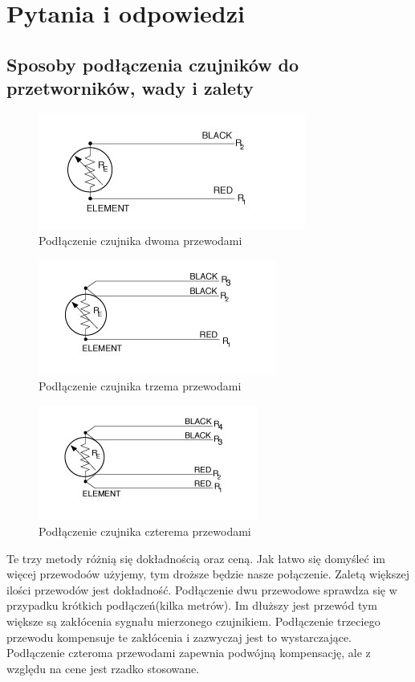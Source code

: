 \documentclass{article}
\begin{document}
\section{Pytania i odpowiedzi}
\subsection{Sposoby podłączenia czujników do przetworników, wady i zalety}
\begin{figure}[h!]
    \centering
    \includegraphics{cw23.jpg}
    \caption{Podłączenie czujnika dwoma przewodami}
    \label{fig:my_label}
\end{figure}
\begin{figure}[h!]
    \centering
    \includegraphics{cw24.jpg}
    \caption{Podłączenie czujnika trzema przewodami}
    \label{fig:my_label}
\end{figure}
\begin{figure}[h!]
    \centering
    \includegraphics{cw25.jpg}
    \caption{Podłączenie czujnika czterema przewodami}
    \label{fig:my_label}
\end{figure}
Te trzy metody różnią się dokładnością oraz ceną. Jak łatwo się domyśleć im więcej przewodoów użyjemy, tym droższe będzie nasze połączenie.
Zaletą większej ilości przewodów jest dokładność. Podłączenie dwu przewodowe sprawdza się w przypadku krótkich podłączeń(kilka metrów).
Im dłuższy jest przewód tym większe są zakłócenia sygnału mierzonego czujnikiem. Podłączenie trzeciego przewodu kompensuje te zakłócenia i 
zazwyczaj jest to wystarczające. Podłączenie czteroma przewodami zapewnia podwójną kompensację, ale z względu na cene jest rzadko stosowane. 
\end{document}
